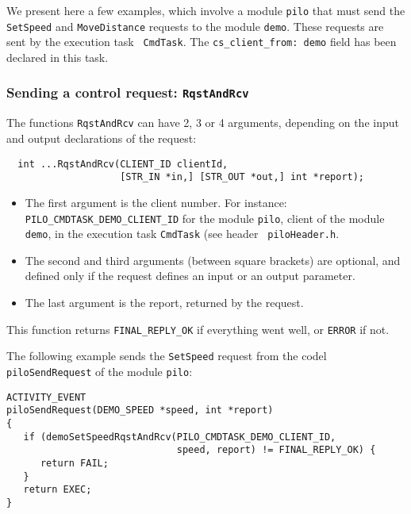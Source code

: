We  present here a few  examples, which involve  a module {\tt pilo} that
must send  the {\tt  SetSpeed} and   {\tt MoveDistance}  requests  to the
module {\tt demo}. These  requests are  sent  by the execution  task {\tt
CmdTask}. The {\tt  cs\_client\_from:  demo} field has been   declared in
this task.

\subsubsection{Sending a control request: {\tt RqstAndRcv}}

The functions {\tt RqstAndRcv} can have 2, 3 or 4 arguments, depending on
the input and output declarations of the request:

\begin{center}\begin{cartouche}\small\begin{verbatim}
  int ...RqstAndRcv(CLIENT_ID clientId,
                    [STR_IN *in,] [STR_OUT *out,] int *report);
\end{verbatim}\end{cartouche}\end{center}

\begin{itemize}
\item The first argument is the client number. For instance: {\tt
PILO\_CMDTASK\_DEMO\_CLIENT\_ID} for the module {\tt pilo}, client of the
module {\tt  demo}, in the execution  task {\tt CmdTask} (see header {\tt
piloHeader.h}.

\item The second and third arguments (between square brackets) are
optional, and defined only if the request defines an input or an output
parameter.

\item The last argument is the report, returned by the request.
\end{itemize}

This function returns {\tt FINAL\_REPLY\_OK}  if everything went well, or
{\tt ERROR} if not.

\bigbreak

The following example sends the {\tt SetSpeed} request from the codel
{\tt piloSendRequest} of the module {\tt pilo}:

\begin{center}\begin{cartouche}\small\begin{verbatim}
ACTIVITY_EVENT
piloSendRequest(DEMO_SPEED *speed, int *report)
{
   if (demoSetSpeedRqstAndRcv(PILO_CMDTASK_DEMO_CLIENT_ID, 
                              speed, report) != FINAL_REPLY_OK) {
      return FAIL;
   }
   return EXEC;
}
\end{verbatim}\end{cartouche}\end{center}


